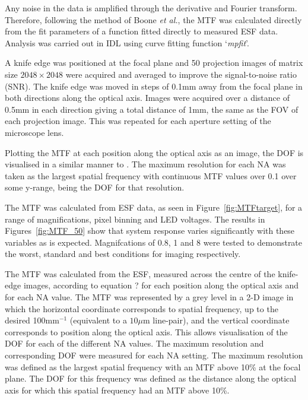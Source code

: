 Any noise in the data is amplified  through the derivative and Fourier transform. Therefore, following the method of Boone \textit{et al.},   the MTF was calculated directly from the fit parameters of a function  fitted directly to measured ESF data. \cite{Boone:1994} Analysis was carried out in IDL  using curve fitting function `\textit{mpfit}'.  \cite{Markwardt2009mpfit}

A knife edge was positioned at the focal plane and 50 projection images of matrix size $2048\times 2048$ were acquired and averaged to improve the signal-to-noise ratio (SNR). The knife edge was moved in steps of 0.1mm away from the focal plane in both directions along the optical axis.  Images were acquired over a distance of 0.5mm in each direction giving a total distance of 1mm, the same as the FOV of each projection image. This was repeated for each aperture setting of the microscope lens.


Plotting the MTF at each position along the optical axis as an image, the DOF is visualised in a similar manner to  \cite{chenincorporation2012}. The maximum resolution for each NA was taken as the largest spatial frequency with continuous MTF values over 0.1 over some y-range, being the DOF for that resolution.


The MTF was calculated from ESF data, as seen in Figure~\ref{fig:MTFtarget},  for a range of magnifications, pixel binning and LED voltages. The results  in Figures~\ref{fig:MTF_50}  show that system response varies significantly with these variables as is expected. Magnifcations of 0.8, 1 and 8 were tested to demonstrate the worst,  standard and best conditions for imaging respectively.





The MTF was calculated from the ESF, measured across the centre of the knife-edge images, according to equation ? for each position along the optical axis and for each NA value. The MTF was represented by a grey level in a 2-D image in which the horizontal coordinate corresponds to spatial frequency, up to the desired 100mm$^{-1}$ (equivalent to a $10\mu$m line-pair), and the vertical coordinate corresponds to position along the optical axis. This allows visualisation of the DOF for each of the different NA values.
The maximum resolution and corresponding DOF were measured for each NA setting. The maximum resolution was defined as the largest spatial frequency with an MTF above 10\% at the focal plane. The DOF for this frequency was defined as the distance along the optical axis for which this spatial frequency had an MTF above 10\%.  



